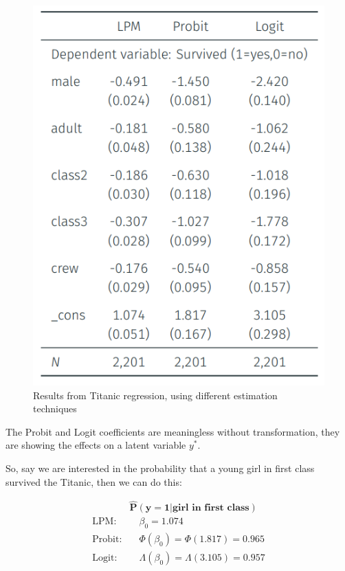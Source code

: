 \documentclass[11pt]{article}
\begin{document}
\begin{figure}
    \centering
    \includegraphics{photos/titanic results.png}
    \caption{Results from Titanic regression, using different estimation techniques}
    \label{fig: titanic inference}
\end{figure}

\begin{note}
    The Probit and Logit coefficients are meaningless without transformation, they are showing the effects on a latent variable $y^*$.
\end{note}

So, say we are interested in the probability that a young girl in first class survived the Titanic, then we can do this:

\begin{align}
    &\boldsymbol{\hat{P}(y=1| \text{girl in first class})} \\
    \text{LPM:} & \quad \beta_0 = 1.074 \\
    \text{Probit:} & \quad \Phi(\beta_0) = \Phi(1.817) = 0.965 \\
    \text{Logit:} & \quad \Lambda(\beta_0) = \Lambda(3.105) = 0.957
\end{align}
\end{document}
